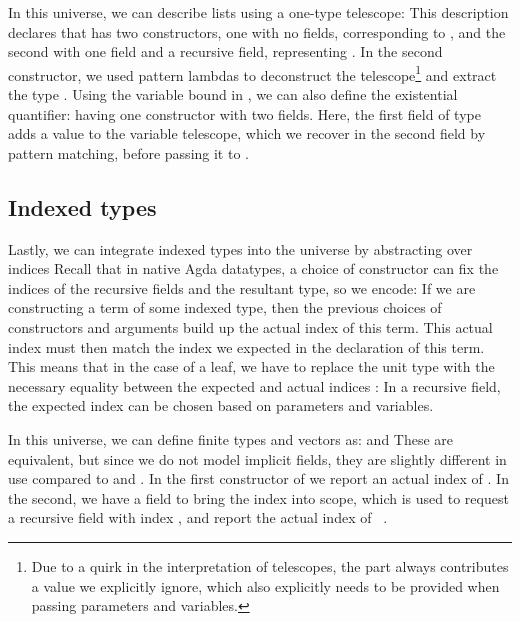 In this universe, we can describe lists using a one-type telescope:
This description declares that  has two constructors, one with no fields, corresponding to \AIC{[]}, and the second with one field and a recursive field, representing . In the second constructor, we used pattern lambdas to deconstruct the telescope\footnote{Due to a quirk in the interpretation of telescopes, the  part always contributes a value  we explicitly ignore, which also explicitly needs to be provided when passing parameters and variables.} and extract the type .
Using the variable bound in , we can also define the existential quantifier:
having one constructor with two fields. Here, the first field of type  adds a value  to the variable telescope, which we recover in the second field by pattern matching, before passing it to .


\subsection{Indexed types}\label{ssec:background-ix}
Lastly, we can integrate indexed types \cite{iir} into the universe by abstracting over indices
Recall that in native Agda datatypes, a choice of constructor can fix the indices of the recursive fields and the resultant type, so we encode:
If we are constructing a term of some indexed type, then the previous choices of constructors and arguments build up the actual index of this term. This actual index must then match the index we expected in the declaration of this term. This means that in the case of a leaf, we have to replace the unit type with the necessary equality between the expected and actual indices \cite{algorn}:
In a recursive field, the expected index can be chosen based on parameters and variables. %

In this universe, we can define finite types and vectors as:
and
These are equivalent, but since we do not model implicit fields, they are slightly different in use compared to  and . In the first constructor of  we report an actual index of . In the second, we have a field \bN{} to bring the index  into scope, which is used to request a recursive field with index , and report the actual index of \ . 


